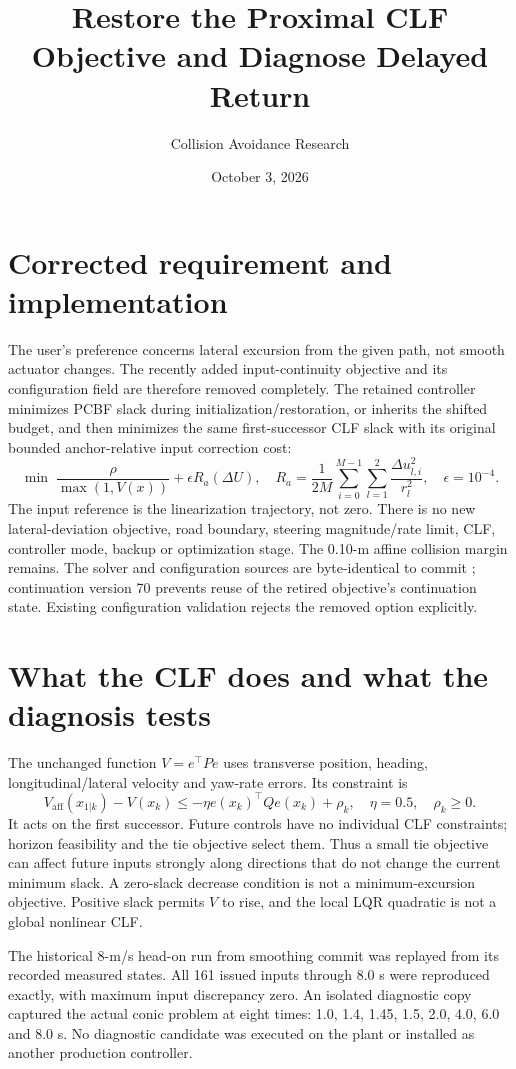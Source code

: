 \documentclass[10pt]{article}
\title{Restore the Proximal CLF Objective and Diagnose Delayed Return}
\author{Collision Avoidance Research}
\date{October 3, 2026}
\begin{document}
\maketitle
\section{Corrected requirement and implementation}
The user's preference concerns lateral excursion from the given path, not
smooth actuator changes. The recently added input-continuity objective and
its configuration field are therefore removed completely. The retained
controller minimizes PCBF slack during initialization/restoration, or inherits
the shifted budget, and then minimizes the same first-successor CLF slack with
its original bounded anchor-relative input correction cost:
\[
 \min\;\frac{\rho}{\max(1,V(x))}+\epsilon R_a(\Delta U),\quad
 R_a=\frac{1}{2M}\sum_{i=0}^{M-1}\sum_{l=1}^{2}
       \frac{\Delta u_{l,i}^2}{r_l^2},\quad \epsilon=10^{-4}.
\]
The input reference is the linearization trajectory, not zero. There is no
new lateral-deviation objective, road boundary, steering magnitude/rate limit,
CLF, controller mode, backup or optimization stage. The 0.10-m affine collision
margin remains. The solver and configuration sources are byte-identical to
commit ; continuation version 70
prevents reuse of the retired objective's continuation state. Existing
configuration validation rejects the removed option explicitly.

\section{What the CLF does and what the diagnosis tests}
The unchanged function $V=e^\top P e$ uses transverse position, heading,
longitudinal/lateral velocity and yaw-rate errors. Its constraint is
\[
 V_{\mathrm{aff}}(x_{1|k})-V(x_k)
 \le-\eta e(x_k)^\top Qe(x_k)+\rho_k,\quad \eta=0.5,\quad\rho_k\ge0.
\]
It acts on the first successor. Future controls have no individual CLF
constraints; horizon feasibility and the tie objective select them. Thus a
small tie objective can affect future inputs strongly along directions that
do not change the current minimum slack. A zero-slack decrease condition is
not a minimum-excursion objective. Positive slack permits $V$ to rise, and the
local LQR quadratic is not a global nonlinear CLF.

The historical 8-m/s head-on run from smoothing commit
 was replayed from its recorded
measured states. All 161 issued inputs through 8.0 s were reproduced exactly,
with maximum input discrepancy zero. An isolated diagnostic copy captured
the actual conic problem at eight times: 1.0, 1.4, 1.45, 1.5, 2.0, 4.0,
6.0 and 8.0 s. No diagnostic candidate was executed on the plant or installed
as another production controller.
\end{document}
